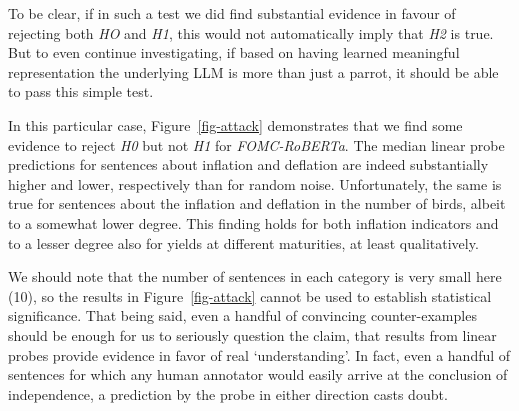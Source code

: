 \documentclass{article}
\theoremstyle{plain}
\theoremstyle{definition}
\theoremstyle{remark}
\begin{document}
To be clear, if in such a test we did find substantial evidence in favour of rejecting both \emph{HO} and \emph{H1}, this would not automatically imply that \emph{H2} is true. But to even continue investigating, if based on having learned meaningful representation the underlying LLM is more than just a parrot, it should be able to pass this simple test.

In this particular case, Figure~\ref{fig-attack} demonstrates that we find some evidence to reject \emph{H0} but not \emph{H1} for \emph{FOMC-RoBERTa}. The median linear probe predictions for sentences about inflation and deflation are indeed substantially higher and lower, respectively than for random noise. Unfortunately, the same is true for sentences about the inflation and deflation in the number of birds, albeit to a somewhat lower degree. This finding holds for both inflation indicators and to a lesser degree also for yields at different maturities, at least qualitatively.

We should note that the number of sentences in each category is very small here (10), so the results in Figure~\ref{fig-attack} cannot be used to establish statistical significance. That being said, even a handful of convincing counter-examples should be enough for us to seriously question the claim, that results from linear probes provide evidence in favor of real `understanding'. In fact, even a handful of sentences for which any human annotator would easily arrive at the conclusion of independence, a prediction by the probe in either direction casts doubt.
\end{document}

